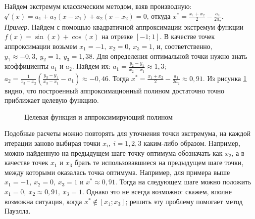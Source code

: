 \documentclass[a4paper,12pt]{report}
\begin{document}
Найдем экстремум классическим методом, взяв производную: $q'(x) = a_{1} + a_{2}(x-x_{1}) + a_{2}(x-x_{2}) = 0$, откуда $x^{*} = \frac{x_{1} + x_{2}}{2} - \frac{a_{1}}{2a_{2}}$.\\

\textit{Пример}. Найдем с помощью квадратичной аппроксимации экстремум функции $f(x) = \sin(x) + \cos(x)$ на отрезке $[-1; 1]$. В качестве точек аппроксимации возьмем $x_{1} = -1,\ x_{2} = 0,\ x_{3} = 1$, и, соответственно, $y_{1} \approx -0,3,\ y_{2} = 1,\ y_{3} = 1,38$. Для определения оптимальной точки нужно знать коэффициенты $a_{1}$ и $a_{2}$. Найдем их: $a_{1} = \frac{y_{2} - y_{1}}{x_{2} - x_{1}} \approx 1,3$; $a_{2} = \frac{1}{x_{3} - x_{2}}\left(\frac{y_{3}-y_{1}}{x_{3}-x_{1}} - a_{1}\right) \approx -0,46$. Тогда $x^{*} = \frac{x_{1} + x_{2}}{2} - \frac{a_{1}}{2a_{2}} \approx 0,91$. Из рисунка \ref{fig:approx_example} видно, что построенный аппроксимационный полином достаточно точно приближает целевую функцию.

\begin{figure}[ht]
\caption{Целевая функция и аппроксимирующий полином}
\label{fig:approx_example}
\end{figure}

Подобные расчеты можно повторять для уточнения точки экстремума, на каждой итерации заново выбирая точки $x_{i},\ i=1,2,3$ каким-либо образом. Например, можно найденную на предыдущем шаге точку оптимума обозначать как $x_{2}$, а в качестве точек $x_{1}$ и $x_{3}$ брать те использовавшиеся на предыдущем шаге точки, между которыми оказалась точка оптимума. Например, для примера выше $x_{1} = -1,\ x_{2} = 0,\ x_{3} = 1$ и $x^{*} \approx 0,91$. Тогда на следующем шаге можно положить $x_{1} = 0,\ x_{2} \approx 0,91 ,\ x_{3} = 1$. Однако это не всегда возможно: скажем, вполне возможна ситуация, когда $x^{*} \notin [x_{1}; x_{3}]$; решить эту проблему помогает метод Пауэлла.
\end{document}
